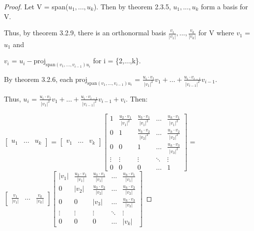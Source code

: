     \begin{proof}
        Let V = span($u_1,...,u_k$). Then by {\color{red} theorem 2.3.5},
        $u_1,...,u_k$ form a basis for V.
        
        Thus, by {\color{red} theorem 3.2.9}, there is an orthonormal basis
        $\frac{v_1}{|v_1|},...,\frac{v_k}{|v_k|}$ for V where $v_1$ = $u_1$ and

        $v_i$ = $u_i - \text{proj}_{\text{span}(v_1,...,v_{i-1})u_i}$
        for i = \{2,...,k\}.

        By {\color{red} theorem 3.2.6}, each
        $\text{proj}_{\text{span}(v_1,...,v_{i-1})u_i}$
        = $\frac{u_i \cdot v_1}{|v_1|^2}v_1
            + ... + \frac{u_i \cdot v_{i-1}}{|v_{i-1}|^2}v_{i-1}$.
        
        Thus, $u_i$
        = $\frac{u_i \cdot v_1}{|v_1|^2}v_1
            + ... + \frac{u_i \cdot v_{i-1}}{|v_{i-1}|^2}v_{i-1}
            + v_i$. Then:

        \hspace{0.5cm}
        \scriptsize
        $\begin{bmatrix}
            u_1 & ... & u_k
        \end{bmatrix}$ =
        $\begin{bmatrix}
            v_1 & ... & v_k
        \end{bmatrix}
        \begin{bmatrix}
            1 & \frac{u_2 \cdot v_1}{|v_1|^2} & \frac{u_3 \cdot v_1}{|v_1|^2}
                & \hdots & \frac{u_k \cdot v_1}{|v_1|^2} \\
            0 & 1 & \frac{u_3 \cdot v_2}{|v_2|^2}
                & \hdots & \frac{u_k \cdot v_2}{|v_2|^2} \\
            0 & 0 & 1
                & \hdots & \frac{u_k \cdot v_3}{|v_3|^2} \\
            \vdots & \vdots & \vdots & \ddots & \vdots \\
            0 & 0 & 0 & \hdots & 1
        \end{bmatrix}$ =
        $\begin{bmatrix}
            \frac{v_1}{|v_1|} & ... & \frac{v_k}{|v_k|}
        \end{bmatrix}
        \begin{bmatrix}
            |v_1| & \frac{u_2 \cdot v_1}{|v_1|} & \frac{u_3 \cdot v_1}{|v_1|}
                & \hdots & \frac{u_k \cdot v_1}{|v_1|} \\
            0 & |v_2| & \frac{u_3 \cdot v_2}{|v_2|}
                & \hdots & \frac{u_k \cdot v_2}{|v_2|} \\
            0 & 0 & |v_3|
                & \hdots & \frac{u_k \cdot v_3}{|v_3|} \\
            \vdots & \vdots & \vdots & \ddots & \vdots \\
            0 & 0 & 0 & \hdots & |v_k|
        \end{bmatrix}$
        \normalsize


\end{proof}
